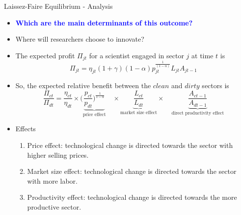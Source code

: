 \documentclass[aspectratio=169,xcolor=dvipsnames]{beamer}
\begin{document}
\begin{frame}{Laissez-Faire Equilibrium - Analysis}
\begin{itemize}
    \item \textcolor{blue}{\textbf{Which are the main determinants of this outcome?}}
    \item Where will researchers choose to innovate?
    \item The expected profit $\Pi_{jt}$ for a scientist engaged in sector $j$ at time $t$ is 
    \begin{equation*}
        \Pi_{jt} = \eta_{jt}(1+\gamma)(1-\alpha) p_{jt}^{\frac{1}{(1-\alpha)}}L_{jt}A_{jt-1}
    \end{equation*}
    \item So, the expected relative benefit between the $clean$ and $dirty$ sectors is
    \begin{equation*}
        \frac{\Pi_{ct} }{\Pi_{dt} } = \frac{\eta_{ct}}{\eta_{dt}}  \times \Bigg(\underbrace{\frac{p_{ct}}{p_{dt}}\Bigg)^{\frac{1}{1-\alpha}} }_{\text{price effect}}\quad \times  \underbrace{\frac{ L_{ct}}{ L_{dt}}}_{\text{market size effect}} \times \quad \underbrace{\frac{ A_{ct-1}}{ A_{dt-1}}}_{\text{direct productivity effect}}      
    \end{equation*}
    \item Effects
    \begin{enumerate}
        \item Price effect: technological change is directed towards the sector with higher selling prices. 
        \item Market size effect: technological change is directed towards the sector with more labor. 
        \item Productivity effect: technological change is directed towards the more productive sector. 
    \end{enumerate}
\end{itemize}
\end{frame}
\end{document}
